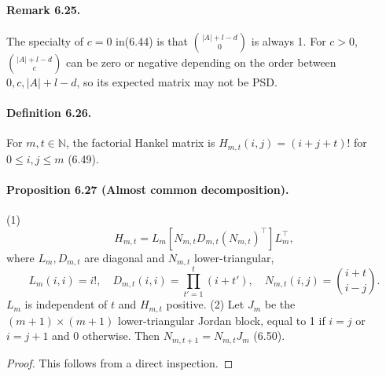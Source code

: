 \documentclass[10pt,a4paper]{article}
\begin{document}
\paragraph{Remark 6.25.} The specialty of $c=0$ in(6.44) is that $\binom{|A|+l-d}0$ is always 1. For $c>0$, $\binom{|A|+l-d}c$ can be zero or negative depending on the order between $0,c,|A|+l-d$, so its expected matrix may not be PSD.
\paragraph{Definition 6.26.} For $m,t\in\mathbb N$, the factorial Hankel matrix is $H_{m,t}(i,j)=(i+j+t)!$ for $0\le i,j\le m$ (6.49).
\paragraph{Proposition 6.27 (Almost common decomposition).} (1)
\[H_{m,t}=L_m[N_{m,t}D_{m,t}(N_{m,t})^\top]L_m^\top,\]
where $L_m,D_{m,t}$ are diagonal and $N_{m,t}$ lower-triangular,
\[L_m(i,i)=i!,\quad D_{m,t}(i,i)=\prod_{t'=1}^t(i+t'),\quad N_{m,t}(i,j)=\binom{i+t}{i-j}.\]
$L_m$ is independent of $t$ and $H_{m,t}$ positive. (2) Let $J_m$ be the $(m+1)\times(m+1)$ lower-triangular Jordan block, equal to 1 if $i=j$ or $i=j+1$ and 0 otherwise. Then $N_{m,t+1}=N_{m,t}J_m$ (6.50).
\begin{proof}This follows from a direct inspection.\end{proof}
\end{document}
